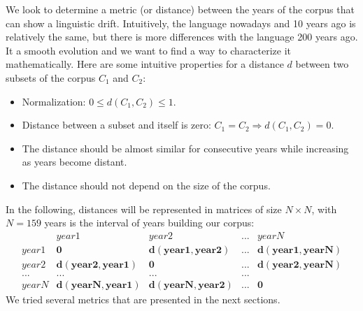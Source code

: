 We look to determine a metric (or distance) between the years of the corpus that can show a linguistic drift. Intuitively, the language nowadays and 10 years ago is relatively the same, but there is more differences with the language 200 years ago. It a smooth evolution and we want to find a way to characterize it mathematically. Here are some intuitive properties for a distance $d$ between two subsets of the corpus $C_1$ and $C_2$:

\begin{itemize}
 \item Normalization: $0 \leq d(C_1,C_2) \leq 1$.
 \item Distance between a subset and itself is zero: $C_1 = C_2 \Rightarrow d(C_1,C_2) = 0$.
 \item The distance should be almost similar for consecutive years while increasing as years become distant.
 \item The distance should not depend on the size of the corpus.
\end{itemize}

In the following, distances will be represented in matrices of size $N \times N$, with $N = 159$ years is the interval of years building our corpus:
\[
\begin{matrix}
 & year1 & year2 & ... & yearN \\
 year1 & \mathbf{0} & \mathbf{d(year1,year2)} & ... & \mathbf{d(year1,yearN)} \\
 year2 & \mathbf{d(year2,year1)} & \mathbf{0} & ... & \mathbf{d(year2,yearN)} \\
 ... & ... & ... & ... \\
 yearN & \mathbf{d(yearN,year1)} & \mathbf{d(yearN,year2)} & ... & \mathbf{0}
\end{matrix}
\]
We tried several metrics that are presented in the next sections.

